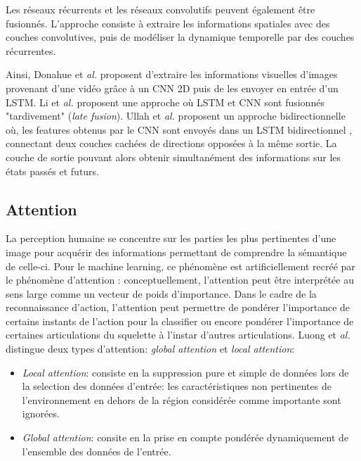 Les réseaux récurrents et les réseaux convolutifs peuvent également être fusionnés. L'approche consiste à extraire les informations spatiales avec des couches convolutives, puis de modéliser la dynamique temporelle par des couches récurrentes.

Ainsi, Donahue et\textit{ al.} \cite{donahue2015long} proposent d'extraire les informations visuelles d'images provenant d'une vidéo grâce à un CNN 2D puis de les envoyer en entrée d'un LSTM.
Li et\textit{ al.} \cite{li2017skeleton} proposent une approche où LSTM et CNN sont fusionnés "tardivement" (\textit{late fusion}). Ullah et\textit{ al.} \cite{ullah2017action} proposent un approche bidirectionnelle où, les features obtenus par le CNN sont envoyés dans un LSTM bidirectionnel \cite{Schuster97bidirectionalrecurrent}, connectant deux couches cachées de directions opposées à la même sortie. La couche de sortie pouvant alors obtenir simultanément des informations sur les états passés et futurs.

\subsection{Attention}
La perception humaine se concentre sur les parties les plus pertinentes d'une image pour acquérir des informations permettant de comprendre la sémantique de celle-ci. Pour le machine learning, ce phénomène est artificiellement recréé  par le phénomène d'attention \cite{bahdanau2014neural,2017arXiv170603762V}: conceptuellement, l'attention peut être interprétée au sens large comme un vecteur de poids d'importance. 
Dans le cadre de la reconnaissance d'action, l'attention peut permettre de pondérer l'importance de certains instants de l'action pour la classifier ou encore pondérer l'importance de certaines articulations du squelette à l'instar d'autres articulations.
Luong et \textit{al.}\cite{luong2015effective} distingue deux types d'attention: \textit{global attention} et \textit{local attention}:
 \begin{itemize}
     \item \textit{Local attention}: consiste en la suppression pure et simple de données lors de la selection des données d'entrée: les caractéristiques non pertinentes de l'environnement en dehors de la région considérée comme importante sont ignorées.
     \item \textit{Global attention}: consite en la prise en compte pondérée dynamiquement de l'ensemble des données de l'entrée.
 \end{itemize}
 
